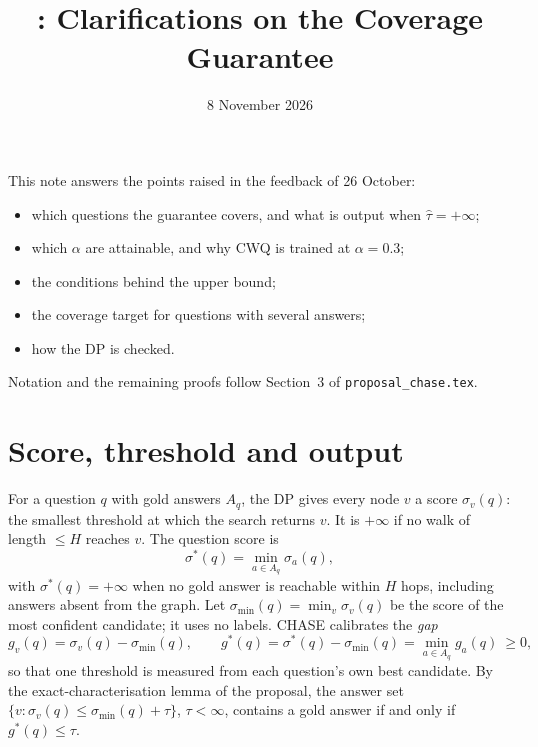 \documentclass[11pt,a4paper]{article}
\title{\method{}: Clarifications on the Coverage Guarantee}
\author{}
\date{8 November 2026}
\theoremstyle{definition}
\theoremstyle{remark}
\newcommand{\tauhat}{\hat{\tau}}
\newcommand{\method}{\textsc{CHASE}}
\newcommand{\code}[1]{\texttt{#1}}
\begin{document}
\maketitle

\noindent This note answers the points raised in the feedback of 26 October:
\begin{itemize}[nosep]
  \item which questions the guarantee covers, and what is output when $\tauhat=+\infty$;
  \item which $\alpha$ are attainable, and why CWQ is trained at $\alpha=0.3$;
  \item the conditions behind the upper bound;
  \item the coverage target for questions with several answers;
  \item how the DP is checked.
\end{itemize}
Notation and the remaining proofs follow Section~3 of \code{proposal\_chase.tex}.

\section{Score, threshold and output}

For a question $q$ with gold answers $A_q$, the DP gives every node $v$ a score $\sigma_v(q)$: the smallest threshold at which the search returns $v$. It is $+\infty$ if no walk of length $\le H$ reaches $v$. The question score is
\[
\sigma^*(q)=\min_{a\in A_q}\sigma_a(q),
\]
with $\sigma^*(q)=+\infty$ when no gold answer is reachable within $H$ hops, including answers absent from the graph. Let $\sigma_{\min}(q)=\min_v\sigma_v(q)$ be the score of the most confident candidate; it uses no labels. \method{} calibrates the \emph{gap}
\[
g_v(q)=\sigma_v(q)-\sigma_{\min}(q),\qquad g^*(q)=\sigma^*(q)-\sigma_{\min}(q)=\min_{a\in A_q}g_a(q)\ \ge 0,
\]
so that one threshold is measured from each question's own best candidate. By the exact-characterisation lemma of the proposal, the answer set $\{v:\sigma_v(q)\le\sigma_{\min}(q)+\tau\}$, $\tau<\infty$, contains a gold answer if and only if $g^*(q)\le\tau$.
\end{document}
